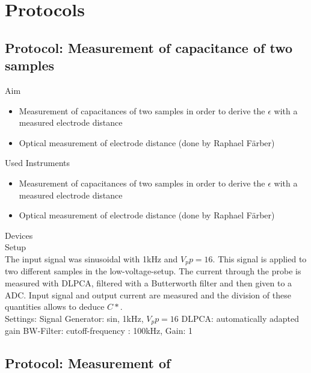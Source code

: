 \chapter{Protocols}
\section{Protocol: Measurement of capacitance of two samples}
\large{Aim} \\
\begin{itemize}

\item Measurement of capacitances of two samples in order to derive the $\epsilon$ with a measured electrode distance 
\item Optical measurement of electrode distance (done by Raphael F\"arber) 
\end{itemize}

\large{Used Instruments} 
\begin{itemize}
\item Measurement of capacitances of two samples in order to derive the $\epsilon$ with a measured electrode distance 
\item Optical measurement of electrode distance (done by Raphael F\"arber) 
\end{itemize}

\large{Devices} \\

\large{Setup} \\
The input signal was  sinusoidal with 1kHz and $V_pp=16$. This signal is applied to two different samples in the low-voltage-setup. The current through the probe is measured with DLPCA, filtered with a Butterworth filter and then given to a ADC. 
Input signal and output current are measured and the division of these quantities allows to deduce $C*$.\\

Settings: \newline
Signal Generator:  sin, 1kHz, $V_pp=16$
DLPCA:  automatically adapted gain
BW-Filter:  cutoff-frequency : 100kHz, Gain: 1




\section{Protocol: Measurement of }

